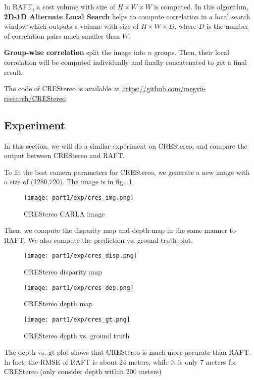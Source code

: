 \documentclass[12pt]{article}
\begin{document}
In RAFT, a cost volume with size of $H\times W\times W$ is computed. In this algorithm, \textbf{2D-1D Alternate Local Search} helps to compute correlation in a local search window which outputs a volume with size of $H\times W\times D$, where $D$ is the number of correlation pairs much smaller than $W$. 

\textbf{Group-wise correlation} split the image into $n$ groups. Then, their local correlation will be computed individually and finally concatenated to get a final result.

The code of CREStereo is available at \url{https://github.com/megvii-research/CREStereo}
\subsection{Experiment}
In this section, we will do a similar experiment on CREStereo, and compare the output between CREStereo and RAFT.

To fit the best camera parameters for CREStereo, we generate a new image with a size of (1280,720). The image is in fig.~\ref{cres_img}
\begin{figure}[H]
    \centering
    \texttt{[image: part1/exp/cres\_img.png]}
    \caption{CREStereo CARLA image}
    \label{cres_img}
\end{figure}
Then, we compute the disparity map and depth map in the same manner to RAFT. We also compute the prediction vs. ground truth plot.
\begin{figure}[H]
    \centering
    \texttt{[image: part1/exp/cres\_disp.png]}
    \caption{CREStereo disparity map}
    \label{cres_disp}
\end{figure}
\begin{figure}[H]
    \centering
    \texttt{[image: part1/exp/cres\_dep.png]}
    \caption{CREStereo depth map}
    \label{cres_dep}
\end{figure}
\begin{figure}[H]
    \centering
    \texttt{[image: part1/exp/cres\_gt.png]}
    \caption{CREStereo depth vs. ground truth}
    \label{cres_gt}
\end{figure}
The depth vs. gt plot shows that CREStereo is much more accurate than RAFT. In fact, the RMSE of RAFT is about 24 meters, while it is only 7 meters for CREStereo (only consider depth within 200 meters)
\end{document}
